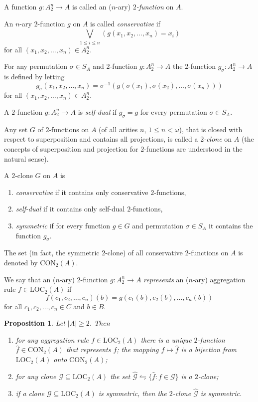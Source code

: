 \documentclass[graybox]{SNmult}
\newtheorem{prop}{Proposition}
\theoremstyle{definition}
\begin{document}
\begin{definition} A function $g:A_2^n\to A$ is called an ($n$-ary) \textit{$2$-function} on $A$. \par An $n$-ary $2$-function $g$ on $A$ is called \textit{conservative} if  
	$$
	\bigvee\limits_{1\leq i\leq n} (g(x_1, x_2, \ldots, x_n)=x_i)
	$$
	for all $(x_1, x_2, \ldots, x_n)\in A_2^n$.
	\par For any permutation $\sigma\in S_A$ and $2$-function $g: A^n_2\to A$ the $2$-function $g_\sigma: A^n_2\to A$ is defined by letting $$
	g_\sigma(x_1, x_2, \ldots, x_n)=\sigma^{-1}(g(\sigma(x_1), \sigma(x_2), \ldots, \sigma(x_n)))
	$$
	for all $(x_1, x_2, \ldots, x_n)\in A^n_2$. \par A $2$-function $g: A^n_2\to A$ is \textit{self-dual} if $g_\sigma=g$ for every permutation $\sigma\in S_A$.
	\par Any set \mbox{$G$} of $2$-functions on $A$ (of all arities $n$, $1\leq n<\omega$), that is closed with respect to superposition and contains all projections, is called a \textit{$2$-clone} on $A$ (the concepts of superposition and projection for $2$-functions are understood in the natural sense). \par A $2$-clone $G$ on $A$ is 
	\begin{enumerate}
		\item \textit{conservative} if it contains only conservative $2$-functions,
		\item \textit{self-dual} if it contains only self-dual $2$-functions,
		\item \textit{symmetric} if for every function $g\in G$ and permutation $\sigma\in S_A$ it contains the function $g_\sigma$.
	\end{enumerate}
	The set (in fact, the symmetric $2$-clone) of all conservative $2$-functions on $A$ is denoted by $\mathrm{CON}_2(A)$. 
\end{definition}
We say that an ($n$-ary) 2-function $g:A^n_2\to A$ \textit{represents} an ($n$-ary) aggregation rule $f\in \mathrm{LOC}_2(A)$ if
$$
f(c_1, c_2, \ldots, c_n)(b)=g(c_1(b), c_2(b), \ldots, c_n(b)) %
$$
for all $c_1, c_2, \ldots, c_n\in C$ and $b\in B$. %
\begin{prop}\label{Prop3} Let $|A|\geq 2$. Then 
	\begin{enumerate}\label{Prop 2}
		\item for any aggregation rule $f\in\mathrm{LOC}_2(A)$ there is a unique $2$-function $\widehat f \in \mathrm{CON}_2(A)$ that represents $f$; the mapping $f\mapsto \widehat f$ is a bijection from $\mathrm{LOC}_2(A)$ onto $\mathrm{CON}_2(A)$;
		\item for any clone $\mathcal G\subseteq \mathrm{LOC}_2(A)$ the set $\widehat {\mathcal G}\leftrightharpoons\{\widehat f: f\in \mathcal G\}$ is a $2$-clone;
		\item if a clone $\mathcal G\subseteq \mathrm{LOC}_2(A)$ is symmetric, then the $2$-clone $\widehat {\mathcal G}$ is symmetric.
	\end{enumerate}
\end{prop}
\end{document}
